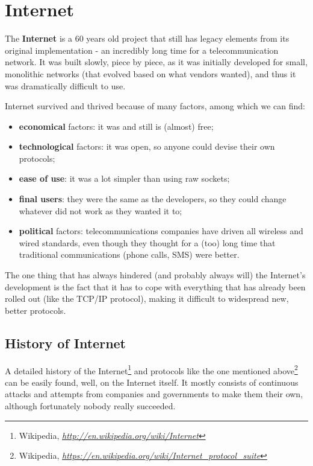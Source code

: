 \chapter{Internet}
\label{ch:internet}

The \textbf{Internet} is a 60 years old project that still has legacy elements from its original implementation - an incredibly long time for a telecommunication network. It was built slowly, piece by piece, as it was initially developed for small, monolithic networks (that evolved based on what vendors wanted), and thus it was dramatically difficult to use.

Internet survived and thrived because of many factors, among which we can find:

\begin{itemize}
    \item \textbf{economical} factors: it was and still is (almost) free;
    \item \textbf{technological} factors: it was open, so anyone could devise their own protocols;
    \item \textbf{ease of use}: it was a lot  simpler than using raw sockets;
    \item \textbf{final users}: they were the same as the developers, so they could change whatever did not work as they wanted it to;
    \item \textbf{political} factors: telecommunications companies have driven all wireless and wired standards, even though they thought for a (too) long time that traditional communications (phone calls, SMS) were better.
\end{itemize}

The one thing that has always hindered (and probably always will) the Internet's development is the fact that it has to cope with everything that has already been rolled out (like the TCP/IP protocol), making it difficult to widespread new, better protocols.


\section{History of Internet}
A detailed history of the Internet\footnote{Wikipedia, \textit{\url{http://en.wikipedia.org/wiki/Internet}}} and protocols like the one mentioned above\footnote{Wikipedia, \textit{\url{https://en.wikipedia.org/wiki/Internet\_protocol\_suite}}} can be easily found, well, on the Internet itself. It mostly consists of continuous attacks and attempts from companies and governments to make them their own, although fortunately nobody really succeeded.

